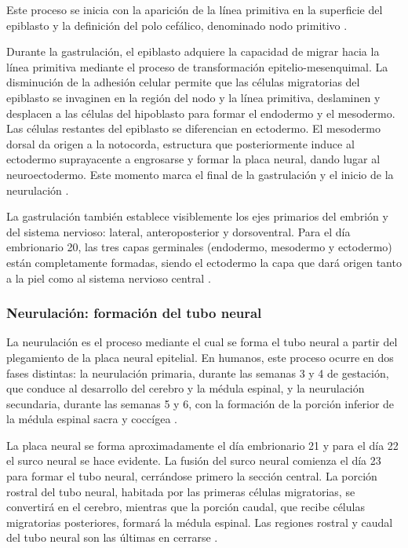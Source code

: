 Este proceso se inicia con la aparición de la línea primitiva en la superficie
del epiblasto y la definición del polo cefálico, denominado nodo primitivo
\cite{MooreEmbryo4}.

Durante la gastrulación, el epiblasto adquiere la capacidad de migrar hacia la
línea primitiva mediante el proceso de transformación epitelio-mesenquimal. La
disminución de la adhesión celular permite que las células migratorias del
epiblasto se invaginen en la región del nodo y la línea primitiva, deslaminen
y desplacen a las células del hipoblasto para formar el endodermo y el
mesodermo. Las células restantes del epiblasto se diferencian en ectodermo. El
mesodermo dorsal da origen a la notocorda, estructura que posteriormente induce
al ectodermo suprayacente a engrosarse y formar la placa neural, dando lugar al
neuroectodermo. Este momento marca el final de la gastrulación y el inicio de
la neurulación \cite{Polin124}.

La gastrulación también establece visiblemente los ejes primarios del embrión y
del sistema nervioso: lateral, anteroposterior y dorsoventral. Para el día
embrionario 20, las tres capas germinales (endodermo, mesodermo y ectodermo)
están completamente formadas, siendo el ectodermo la capa que dará origen tanto
a la piel como al sistema nervioso central \cite{Polin124}.

\subsubsection{Neurulación: formación del tubo neural}
La neurulación es el proceso mediante el cual se forma el tubo neural a partir
del plegamiento de la placa neural epitelial. En humanos, este proceso ocurre
en dos fases distintas: la neurulación primaria, durante las semanas 3 y 4 de
gestación, que conduce al desarrollo del cerebro y la médula espinal, y la
neurulación secundaria, durante las semanas 5 y 6, con la formación de la
porción inferior de la médula espinal sacra y coccígea \cite{Polin124}.

La placa neural se forma aproximadamente el día embrionario 21 y para el día 22
el surco neural se hace evidente. La fusión del surco neural comienza el día 23
para formar el tubo neural, cerrándose primero la sección central. La porción
rostral del tubo neural, habitada por las primeras células migratorias, se
convertirá en el cerebro, mientras que la porción caudal, que recibe células
migratorias posteriores, formará la médula espinal. Las regiones rostral y
caudal del tubo neural son las últimas en cerrarse \cite{Gibb2018}.

